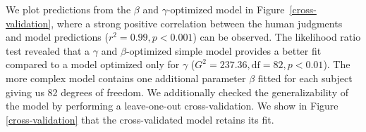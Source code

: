 \documentclass[10pt,a4paper]{article}
\begin{document}



 

We plot predictions from the $\beta$ and $\gamma$-optimized model in Figure~\ref{cross-validation}, where a strong positive correlation between the human judgments and model predictions ($r^2 = 0.99, p < 0.001$) can be observed. The likelihood ratio test revealed that a $\gamma$ and $\beta$-optimized simple model provides a better fit compared to a model optimized only for $\gamma$ ($G^2 = 237.36, \textrm{df} = 82, p < 0.01$). The more complex model contains one additional parameter $\beta$ fitted for each subject giving us 82 degrees of freedom. We additionally checked the generalizability of the model by performing a leave-one-out cross-validation. We show in Figure \ref{cross-validation} that the cross-validated model retains its fit.
\end{document}
